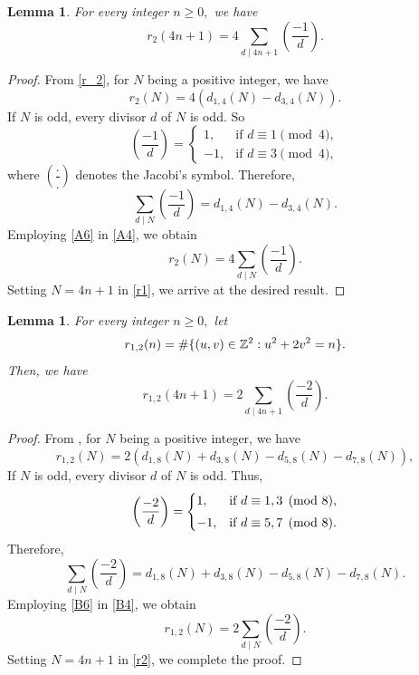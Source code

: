 \documentclass[12pt]{article}
\numberwithin{equation}{section}
\newtheorem{lemma}[theorem]{Lemma}
\theoremstyle{definition}
\theoremstyle{remark}
\numberwithin{equation}{section}
\begin{document}
\begin{lemma}
For every integer $n\geq0,$ we have 
\begin{equation}\label{r_2.4n+1}
r_2(4n+1)=4\sum_{d\mid 4n+1}\left(\dfrac{-1}{d}\right).
\end{equation}
\end{lemma}
\begin{proof}
From \eqref{r_2}, for $N$ being a positive integer, we have
\begin{equation}\label{A4}
r_2(N)=4(d_{1,4}(N)-d_{3,4}(N)).
\end{equation}
If  $N$ is odd,  every divisor $d$ of $N$ is odd. So
$$\left(\dfrac{-1}{d}\right)=
\begin{cases}
1, & \text{if } d\equiv1\pmod 4,\\
-1, & \text{if } d\equiv3\pmod 4, 
\end{cases}$$ where $\left(\dfrac{.}{.}\right)$ denotes the Jacobi's symbol. Therefore, 
\begin{equation}\label{A6}
\sum_{d\mid N}\left(\dfrac{-1}{d}\right)
=
d_{1,4}(N)-d_{3,4}(N).
\end{equation}
Employing \eqref{A6} in \eqref{A4}, we obtain
\begin{equation}\label{r1}
r_2(N)=4\sum_{d\mid N}\left(\dfrac{-1}{d}\right).
\end{equation}
Setting $N=4n+1$ in \eqref{r1}, we arrive at the desired result. 
\end{proof}

\begin{lemma}
For every integer $n\geq0,$ 
let
\begin{equation}
r_{1,2}(n)=\#\{(u,v)\in\mathbb Z^2:u^2+2v^2=n\}.\notag
\end{equation}Then, we have 
\begin{equation}\label{B3}
r_{1,2}(4n+1)=2\sum_{d\mid 4n+1}\left(\dfrac{-2}{d}\right).
\end{equation}
\end{lemma}
\begin{proof}
From \cite[Theorem 3.7.3]{bc}, for $N$ being a positive integer, we have
\begin{equation}\label{B4}
r_{1,2}(N)=2\left(d_{1, 8}(N)+d_{3, 8}(N)-d_{5, 8}(N)-d_{7, 8}(N)\right),
\end{equation} If $N$ is odd, every divisor $d$ of $N$ is odd. Thus,
\begin{equation}
\left(\dfrac{-2}{d}\right)=
\begin{cases}
1, & \text{if } d\equiv1,3\pmod 8,\\[3pt]
-1, & \text{if } d\equiv5,7\pmod 8.
\end{cases}\notag
\end{equation}
Therefore, 
\begin{equation}\label{B6}
\sum_{d\mid N}\left(\dfrac{-2}{d}\right)
=
d_{1,8}(N)+d_{3,8}(N)-d_{5,8}(N)-d_{7,8}(N).
\end{equation}
Employing \eqref{B6} in \eqref{B4}, we obtain
\begin{equation}\label{r2}
r_{1,2}(N)=2\sum_{d\mid N}\left(\dfrac{-2}{d}\right).
\end{equation}
Setting $N=4n+1$ in \eqref{r2}, we complete the proof.
\end{proof}
\end{document}
